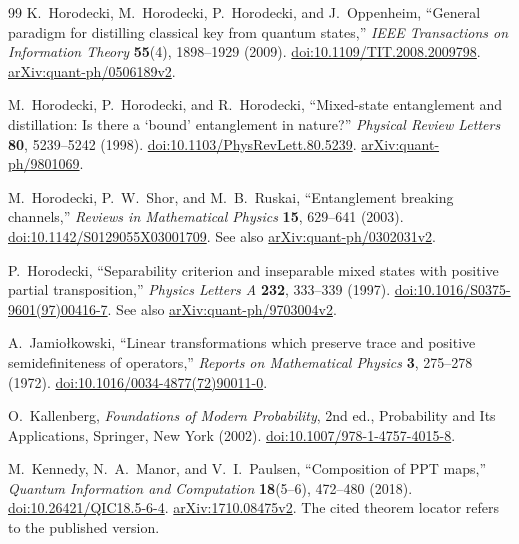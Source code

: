 \begin{thebibliography}{99}
K.~Horodecki, M.~Horodecki, P.~Horodecki, and J.~Oppenheim,
``General paradigm for distilling classical key from quantum states,''
\emph{IEEE Transactions on Information Theory} \textbf{55}(4),
1898--1929 (2009).
\href{https://doi.org/10.1109/TIT.2008.2009798}{doi:10.1109/TIT.2008.2009798}.
\href{https://arxiv.org/abs/quant-ph/0506189v2}{arXiv:quant-ph/0506189v2}.

M.~Horodecki, P.~Horodecki, and R.~Horodecki,
``Mixed-state entanglement and distillation: Is there a `bound' entanglement in nature?''
\emph{Physical Review Letters} \textbf{80}, 5239--5242 (1998).
\href{https://doi.org/10.1103/PhysRevLett.80.5239}{doi:10.1103/PhysRevLett.80.5239}.
\href{https://arxiv.org/abs/quant-ph/9801069}{arXiv:quant-ph/9801069}.

M.~Horodecki, P.~W.~Shor, and M.~B.~Ruskai,
``Entanglement breaking
channels,'' \emph{Reviews in Mathematical Physics} \textbf{15}, 629--641 (2003).
\href{https://doi.org/10.1142/S0129055X03001709}{doi:10.1142/S0129055X03001709}.
See also \href{https://arxiv.org/abs/quant-ph/0302031v2}{arXiv:quant-ph/0302031v2}.

P.~Horodecki,
``Separability criterion and inseparable mixed states with
positive partial transposition,'' \emph{Physics Letters A} \textbf{232}, 333--339 (1997).
\href{https://doi.org/10.1016/S0375-9601(97)00416-7}{doi:10.1016/S0375-9601(97)00416-7}.
See also \href{https://arxiv.org/abs/quant-ph/9703004v2}{arXiv:quant-ph/9703004v2}.

A.~Jamio\l kowski,
``Linear transformations which preserve trace and
positive semidefiniteness of operators,'' \emph{Reports on Mathematical Physics}
\textbf{3}, 275--278 (1972).
\href{https://doi.org/10.1016/0034-4877(72)90011-0}{doi:10.1016/0034-4877(72)90011-0}.

O.~Kallenberg,
\emph{Foundations of Modern Probability}, 2nd ed.,
Probability and Its Applications, Springer, New York (2002).
\href{https://doi.org/10.1007/978-1-4757-4015-8}{doi:10.1007/978-1-4757-4015-8}.

M.~Kennedy, N.~A.~Manor, and V.~I.~Paulsen,
``Composition of PPT maps,''
\emph{Quantum Information and Computation} \textbf{18}(5--6), 472--480 (2018).
\href{https://doi.org/10.26421/QIC18.5-6-4}{doi:10.26421/QIC18.5-6-4}.
\href{https://arxiv.org/abs/1710.08475v2}{arXiv:1710.08475v2}.
The cited theorem locator refers to the published version.


\end{thebibliography}

